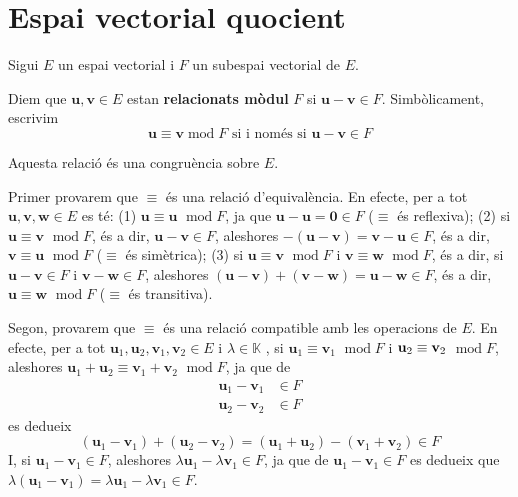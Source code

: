 \section{Espai vectorial quocient}

Sigui $E$ un espai vectorial i $F$ un subespai vectorial
de $E$.

\begin{definicio}
Diem que $\mathbf{u},\mathbf{v}\in E$ estan \textbf{%
relacionats mòdul} $F$ si $\mathbf{u}-\mathbf{v}\in F
$. Simbòlicament, escrivim%
\begin{equation*}
\mathbf{u}\equiv \mathbf{v}\operatorname{mod}F\text{ si i només si }%
\mathbf{u}-\mathbf{v}\in F
\end{equation*}
\end{definicio}

\begin{teorema}
Aquesta relació és una congruència sobre $E$.

\end{teorema}
\begin{prova}
Primer provarem que $\equiv $ és una relació d'equivalència. En
efecte, per a tot $\mathbf{u},\mathbf{v},\mathbf{w}\in E$ es té:
(1) $\mathbf{u}\equiv \mathbf{u}$ $\operatorname{mod}F$, ja que $\mathbf{u}-%
\mathbf{u}=\mathbf{0}\in F$ ($\equiv $ és reflexiva); (2) si $%
\mathbf{u}\equiv \mathbf{v}$ $\operatorname{mod}F$, és a dir, $\mathbf{u}-%
\mathbf{v}\in F$, aleshores $-(\mathbf{u}-\mathbf{v})=\mathbf{v}-%
\mathbf{u}\in F$, és a dir, $\mathbf{v}\equiv \mathbf{u}$ $\operatorname{mod}F$ ($\equiv $ és simètrica); (3) si $\mathbf{u}\equiv \mathbf{v%
}$ $\operatorname{mod}F$ i $\mathbf{v}\equiv \mathbf{w}$ $\operatorname{mod}F$, és a dir, si $\mathbf{u}-\mathbf{v}\in F$ i $\mathbf{v}-%
\mathbf{w}\in F$, aleshores $\left( \mathbf{u}-\mathbf{v}\right)
+\left( \mathbf{v}-\mathbf{w}\right) =\mathbf{u}-\mathbf{w}\in F$,
és a dir, $\mathbf{u}\equiv \mathbf{w}$ $\operatorname{mod}F$ ($\equiv $ és
transitiva).

Segon, provarem que $\equiv $ és una relació compatible amb les
operacions de $E$. En efecte, per a tot $\mathbf{u}_{1},\mathbf{u}%
_{2},\mathbf{v}_{1},\mathbf{v}_{2}\in E$ i $\lambda \in \mathbb{K}$%
, si $\mathbf{u}_{1}\equiv \mathbf{v}_{1}$ $\operatorname{mod}F$ i $\mathbf{%
u}_{2}\equiv \mathbf{v}_{2}$ $\operatorname{mod}F$, aleshores $\mathbf{u}%
_{1}+\mathbf{u}_{2}\equiv \mathbf{v}_{1}+\mathbf{v}_{2}$ $\operatorname{mod}F$, ja que de 
\begin{align*}
\mathbf{u}_{1}-\mathbf{v}_{1} &\in F \\
\mathbf{u}_{2}-\mathbf{v}_{2} &\in F
\end{align*}%
es dedueix%
\begin{equation*}
\left( \mathbf{u}_{1}-\mathbf{v}_{1}\right) +\left( \mathbf{u}_{2}-\mathbf{v}%
_{2}\right) =\left( \mathbf{u}_{1}+\mathbf{u}_{2}\right) -(\mathbf{v}_{1}+%
\mathbf{v}_{2})\in F
\end{equation*}%
I, si $\mathbf{u}_{1}-\mathbf{v}_{1}\in F$, aleshores $\lambda 
\mathbf{u}_{1}-\lambda \mathbf{v}_{1}\in F$, ja que de $\mathbf{u}%
_{1}-\mathbf{v}_{1}\in F$ es dedueix que $\lambda (\mathbf{u}_{1}-%
\mathbf{v}_{1})=\lambda \mathbf{u}_{1}-\lambda \mathbf{v}_{1}\in F$.
\end{prova}

